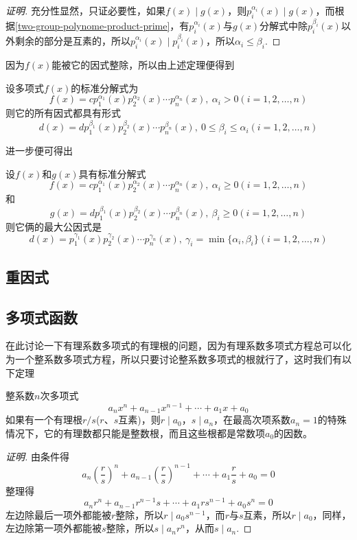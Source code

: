 \begin{proof}[证明]
  充分性显然，只证必要性，如果$f(x) \mid g(x)$，则$p_i^{\alpha_i}(x) \mid g(x)$，而根据\autoref{two-group-polynome-product-prime}，有$p_i^{\alpha_i}(x)$与$g(x)$分解式中除$p_i^{\beta_i}(x)$以外剩余的部分是互素的，所以$p_i^{\alpha_i}(x) \mid p_i^{\beta_i}(x)$，所以$\alpha_i \leqslant \beta_i$.
\end{proof}

因为$f(x)$能被它的因式整除，所以由上述定理便得到
\begin{theorem}
  设多项式$f(x)$的标准分解式为
\[ f(x)=c p_1^{\alpha_1}(x)p_2^{\alpha_2}(x) \cdots p_n^{\alpha_n}(x), \  \alpha_i>0 (i=1,2,\ldots,n) \]
则它的所有因式都具有形式
\[ d(x)=d p_1^{\beta_1}(x)p_2^{\beta_2}(x) \cdots p_n^{\beta_n}(x), \  0 \leqslant \beta_i \leqslant \alpha_i (i=1,2,\ldots,n) \]
\end{theorem}

进一步便可得出
\begin{theorem}
  设$f(x)$和$g(x)$具有标准分解式
\[ f(x)=c p_1^{\alpha_1}(x)p_2^{\alpha_2}(x) \cdots p_n^{\alpha_n}(x), \  \alpha_i \geqslant 0 (i=1,2,\ldots,n) \]
和
\[ g(x)=d p_1^{\beta_1}(x)p_2^{\beta_2}(x) \cdots p_n^{\beta_n}(x), \  \beta_i \geqslant 0 (i=1,2,\ldots,n) \]
则它俩的最大公因式是
\[ d(x)= p_1^{\gamma_1}(x)p_2^{\gamma_2}(x) \cdots p_n^{\gamma_n}(x), \  \gamma_i=\min\{\alpha_i,\beta_i\} (i=1,2,\ldots,n) \]
\end{theorem}


\subsection{重因式}
\label{sec:mulitple-factor}

\subsection{多项式函数}
\label{sec:polynome-function}

在此讨论一下有理系数多项式的有理根的问题，因为有理系数多项式方程总可以化为一个整系数多项式方程，所以只要讨论整系数多项式的根就行了，这时我们有以下定理
\begin{theorem}
  整系数$n$次多项式
  \[ a_nx^n+a_{n-1}x^{n-1}+\cdots+a_1x+a_0 \]
  如果有一个有理根$r/s$($r$、$s$互素)，则$r \mid a_0$，$s \mid a_n$，在最高次项系数$a_n=1$的特殊情况下，它的有理数都只能是整数根，而且这些根都是常数项$a_0$的因数。
\end{theorem}

\begin{proof}[证明]
  由条件得
  \[ a_n \left( \frac{r}{s} \right)^{n} + a_{n-1}\left( \frac{r}{s} \right)^{n-1} + \cdots + a_1 \frac{r}{s} + a_0 = 0 \]
  整理得
  \[ a_nr^n + a_{n-1}r^{n-1}s + \cdots + a_1rs^{n-1} + a_0s^n = 0 \]
  左边除最后一项外都能被$r$整除，所以$r \mid a_0s^{n-1}$，而$r$与$s$互素，所以$r \mid a_0$，同样，左边除第一项外都能被$s$整除，所以$s \mid a_nr^n$，从而$s \mid a_n$.
\end{proof}

